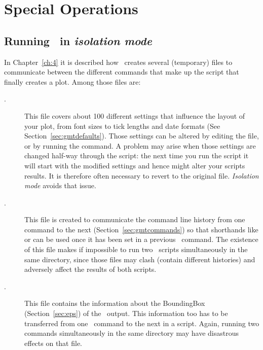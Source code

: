 %
%

\chapter{Special Operations}
\label{app:P}
\thispagestyle{headings}

\section{Running \gmt\ in \emph{isolation mode}}
\label{sec:isolationmode}
In Chapter~\ref{ch:4} it is described how \GMT\ creates several (temporary) files to communicate between the different commands that make up the script that finally creates a plot. Among those files are:
\begin{description}
\item[.] This file covers about 100 different settings that influence the layout of your plot, from font sizes to tick lengths and date formats (See Section~\ref{sec:gmtdefaults}). Those settings can be altered by editing the file, or by running the  command. A problem may arise when those settings are changed half-way through the script: the next time you run the script it will start with the modified settings and hence might alter your scripts results. It is therefore often necessary to revert to the original  file. \emph{Isolation mode} avoids that issue.
\item[.] This file is created to communicate the command line history from one command to the next (Section~\ref{sec:gmtcommands}) so that shorthands like  or  can be used once it has been set in a previous \GMT\ command.
The existence of this file makes if impossible to run two \GMT\ scripts simultaneously in the same directory, since those  files may clash (contain different histories) and adversely affect the results of both scripts.
\item[.] This file contains the information about the BoundingBox (Section~\ref{sec:eps}) of the \PS\ output. This information too has to be transferred from one \GMT\ command to the next in a script. Again, running two commands simultaneously in the same directory may have disastrous effects on that file.
\end{description}

